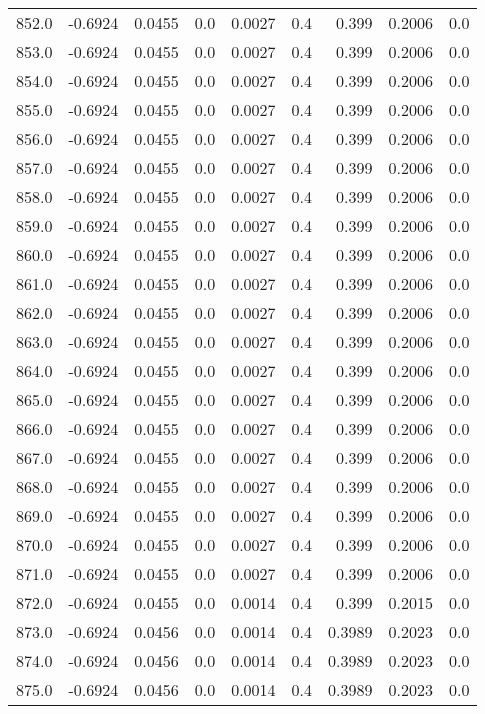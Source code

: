 \begin{longtable}{lrrrrrrrr}
852.0 & -0.6924 & 0.0455 & 0.0 & 0.0027 & 0.4 & 0.399 & 0.2006 & 0.0 \\
853.0 & -0.6924 & 0.0455 & 0.0 & 0.0027 & 0.4 & 0.399 & 0.2006 & 0.0 \\
854.0 & -0.6924 & 0.0455 & 0.0 & 0.0027 & 0.4 & 0.399 & 0.2006 & 0.0 \\
855.0 & -0.6924 & 0.0455 & 0.0 & 0.0027 & 0.4 & 0.399 & 0.2006 & 0.0 \\
856.0 & -0.6924 & 0.0455 & 0.0 & 0.0027 & 0.4 & 0.399 & 0.2006 & 0.0 \\
857.0 & -0.6924 & 0.0455 & 0.0 & 0.0027 & 0.4 & 0.399 & 0.2006 & 0.0 \\
858.0 & -0.6924 & 0.0455 & 0.0 & 0.0027 & 0.4 & 0.399 & 0.2006 & 0.0 \\
859.0 & -0.6924 & 0.0455 & 0.0 & 0.0027 & 0.4 & 0.399 & 0.2006 & 0.0 \\
860.0 & -0.6924 & 0.0455 & 0.0 & 0.0027 & 0.4 & 0.399 & 0.2006 & 0.0 \\
861.0 & -0.6924 & 0.0455 & 0.0 & 0.0027 & 0.4 & 0.399 & 0.2006 & 0.0 \\
862.0 & -0.6924 & 0.0455 & 0.0 & 0.0027 & 0.4 & 0.399 & 0.2006 & 0.0 \\
863.0 & -0.6924 & 0.0455 & 0.0 & 0.0027 & 0.4 & 0.399 & 0.2006 & 0.0 \\
864.0 & -0.6924 & 0.0455 & 0.0 & 0.0027 & 0.4 & 0.399 & 0.2006 & 0.0 \\
865.0 & -0.6924 & 0.0455 & 0.0 & 0.0027 & 0.4 & 0.399 & 0.2006 & 0.0 \\
866.0 & -0.6924 & 0.0455 & 0.0 & 0.0027 & 0.4 & 0.399 & 0.2006 & 0.0 \\
867.0 & -0.6924 & 0.0455 & 0.0 & 0.0027 & 0.4 & 0.399 & 0.2006 & 0.0 \\
868.0 & -0.6924 & 0.0455 & 0.0 & 0.0027 & 0.4 & 0.399 & 0.2006 & 0.0 \\
869.0 & -0.6924 & 0.0455 & 0.0 & 0.0027 & 0.4 & 0.399 & 0.2006 & 0.0 \\
870.0 & -0.6924 & 0.0455 & 0.0 & 0.0027 & 0.4 & 0.399 & 0.2006 & 0.0 \\
871.0 & -0.6924 & 0.0455 & 0.0 & 0.0027 & 0.4 & 0.399 & 0.2006 & 0.0 \\
872.0 & -0.6924 & 0.0455 & 0.0 & 0.0014 & 0.4 & 0.399 & 0.2015 & 0.0 \\
873.0 & -0.6924 & 0.0456 & 0.0 & 0.0014 & 0.4 & 0.3989 & 0.2023 & 0.0 \\
874.0 & -0.6924 & 0.0456 & 0.0 & 0.0014 & 0.4 & 0.3989 & 0.2023 & 0.0 \\
875.0 & -0.6924 & 0.0456 & 0.0 & 0.0014 & 0.4 & 0.3989 & 0.2023 & 0.0 \\

\end{longtable}
